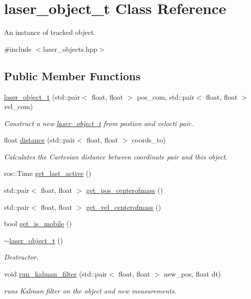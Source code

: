 \hypertarget{classlaser__object__t}{}\section{laser\+\_\+object\+\_\+t Class Reference}
\label{classlaser__object__t}


An instance of tracked object.  




{\ttfamily \#include $<$laser\+\_\+objects.\+hpp$>$}

\subsection*{Public Member Functions}
\begin{DoxyCompactItemize}
\item 
\hyperlink{group__laser__object__t_ga86fb4dc51298aedc38f4dea202e86d94}{laser\+\_\+object\+\_\+t} (std\+::pair$<$ float, float $>$ pos\+\_\+com, std\+::pair$<$ float, float $>$ vel\+\_\+com)
\begin{DoxyCompactList}\small\item\em Construct a new \hyperlink{classlaser__object__t}{laser\+\_\+object\+\_\+t} from postion and velocti pair. \end{DoxyCompactList}\item 
float \hyperlink{group__laser__object__t_ga1306580c845a8e9e37646988d86788c0}{distance} (std\+::pair$<$ float, float $>$ coords\+\_\+to)
\begin{DoxyCompactList}\small\item\em Calculates the Cartesian distance between coordinate pair and this object. \end{DoxyCompactList}\item 
ros\+::\+Time \hyperlink{group__laser__object__t_ga85ea7644afff4ac0315156a182946110}{get\+\_\+last\+\_\+active} ()
\item 
std\+::pair$<$ float, float $>$ \hyperlink{group__laser__object__t_ga02a018369ba1e52d2cec3625f7452c7b}{get\+\_\+pos\+\_\+centerofmass} ()
\item 
std\+::pair$<$ float, float $>$ \hyperlink{group__laser__object__t_gadfafd151af0900623901d162260ba234}{get\+\_\+vel\+\_\+centerofmass} ()
\item 
bool \hyperlink{group__laser__object__t_ga5aba73083c62b017d1e09d9e36a35df1}{get\+\_\+is\+\_\+mobile} ()
\item 
\hyperlink{group__laser__object__t_gac9cc27a949e2af39dc4da7fb0fb8f8d4}{$\sim$laser\+\_\+object\+\_\+t} ()
\begin{DoxyCompactList}\small\item\em Destructor. \end{DoxyCompactList}\item 
void \hyperlink{group__laser__object__t_ga7197f41117174159f618bbdcd63f9cc3}{run\+\_\+kalman\+\_\+filter} (std\+::pair$<$ float, float $>$ new\+\_\+pos, float dt)
\begin{DoxyCompactList}\small\item\em runs Kalman filter on the object and new measurements. \end{DoxyCompactList}\end{DoxyCompactItemize}
